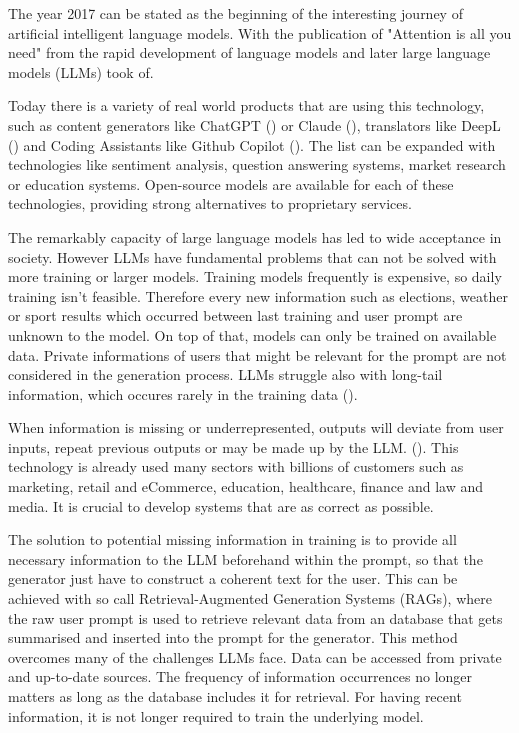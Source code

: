 The year 2017 can be stated as the beginning of the interesting journey of artificial intelligent language models. With the publication of "Attention is all you need" from \citet{vaswani2023attentionneed} the rapid development of language models and later large language models (LLMs) took of. 

Today there is a variety of real world products that are using this technology, such as content generators like ChatGPT (\citet{OpenAI_2022}) or Claude (\citet{Anthropic_2023}), translators like DeepL (\citet{DeepL_SE}) and Coding Assistants like Github Copilot (\citet{Friedman_2022}). The list can be expanded with technologies like sentiment analysis, question answering systems, market research or education systems. Open-source models are available for each of these technologies, providing strong alternatives to proprietary services.

The remarkably capacity of large language models has led to wide acceptance in society. However LLMs have fundamental problems that can not be solved with more training or larger models. Training models frequently is expensive, so daily training isn't feasible. Therefore every new information such as elections, weather or sport results which occurred between last training and user prompt are unknown to the model. On top of that, models can only be trained on available data. Private informations of users that might be relevant for the prompt are not considered in the generation process. LLMs struggle also with long-tail information, which occures rarely in the training data (\citet{Kandpal.15.11.2022}).

When information is missing or underrepresented, outputs will deviate from user inputs, repeat previous outputs or may be made up by the LLM. (\citet{Zhang.03.09.2023}). This technology is already used many sectors with billions of customers such as marketing, retail and eCommerce, education, healthcare, finance and law and media. It is crucial to develop systems that are as correct as possible.

The solution to potential missing information in training is to provide all necessary information to the LLM beforehand within the prompt, so that the generator just have to construct a coherent text for the user. This can be achieved with so call Retrieval-Augmented Generation Systems (RAGs), where the raw user prompt is used to retrieve relevant data from an database that gets summarised and inserted into the prompt for the generator. This method overcomes many of the challenges LLMs face. Data can be accessed from private and up-to-date sources. The frequency of information occurrences no longer matters as long as the database includes it for retrieval. For having recent information, it is not longer required to train the underlying model.


